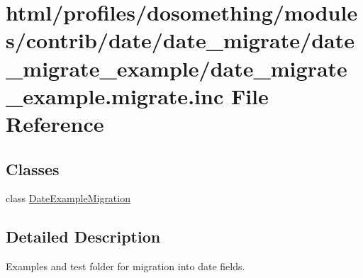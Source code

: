 \hypertarget{date__migrate__example_8migrate_8inc}{
\section{html/profiles/dosomething/modules/contrib/date/date\_\-migrate/date\_\-migrate\_\-example/date\_\-migrate\_\-example.migrate.inc File Reference}
\label{date__migrate__example_8migrate_8inc}
}
\subsection*{Classes}
\begin{DoxyCompactItemize}
\item 
class \hyperlink{classDateExampleMigration}{DateExampleMigration}
\end{DoxyCompactItemize}


\subsection{Detailed Description}
Examples and test folder for migration into date fields. 